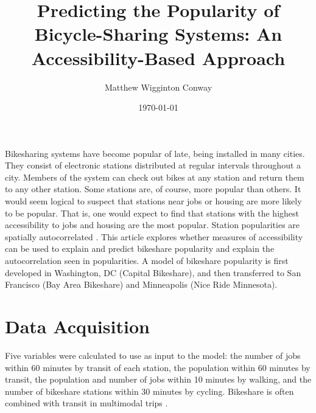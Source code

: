 \documentclass[11pt]{article}
\title{Predicting the Popularity of Bicycle-Sharing Systems: An Accessibility-Based Approach}
\author{Matthew Wigginton Conway}
\date{\today}
\begin{document}
Bikesharing systems have become popular of late, being installed in
many cities. They consist of electronic stations distributed
at regular intervals throughout a city. Members of the system can
check out bikes at any station and return them to any other
station. Some stations are, of course, more popular than others. It
would seem logical to suspect that stations near jobs or housing are
more likely to be popular. That is, one would expect to find that
stations with the highest accessibility to jobs and housing are the
most popular. Station popularities are spatially autocorrelated
\autocite[5--8]{Conway2013}. This article explores whether
measures of accessibility can be used to explain and predict
bikeshare popularity and explain the autocorrelation seen in
popularities. A model of bikeshare popularity is first developed in
Washington, DC (Capital Bikeshare), and then transferred to San
Francisco (Bay Area Bikeshare) and Minneapolis (Nice Ride Minnesota).

\section{Data Acquisition}

Five variables were calculated to use as input to the model: the
number of jobs within 60 minutes by transit of each station, the
population within 60 minutes by transit, the population and number of
jobs within 10 minutes by walking, and the number of bikeshare
stations within 30 minutes by cycling. Bikeshare is often combined
with transit in multimodal trips \autocite[29]{CABI2013}.
\end{document}
